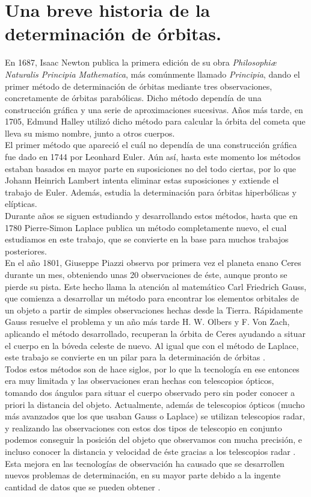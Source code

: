 \section{Una breve historia de la determinación de órbitas.}
\label{sec:history}
En 1687, Isaac Newton publica la primera edición de su obra \textit{Philosophiæ Naturalis Principia Mathematica}, más comúnmente llamado \textit{Principia}, dando el primer método de determinación de órbitas mediante tres observaciones, concretamente de órbitas parabólicas. Dicho método dependía de una construcción gráfica y una serie de aproximaciones sucesivas. Años más tarde, en 1705, Edmund Halley utilizó dicho método para calcular la órbita del cometa que lleva su mismo nombre, junto a otros cuerpos.\\

El primer método que apareció el cuál no dependía de una construcción gráfica fue dado en 1744 por Leonhard Euler. Aún así, hasta este momento los métodos estaban basados en mayor parte en suposiciones no del todo ciertas, por lo que Johann Heinrich Lambert intenta eliminar estas suposiciones y extiende el trabajo de Euler. Además, estudia la determinación para órbitas hiperbólicas y elípticas.\\

Durante años se siguen estudiando y desarrollando estos métodos, hasta que en 1780 Pierre-Simon Laplace publica un método completamente nuevo, el cual estudiamos en este trabajo, que se convierte en la base para muchos trabajos posteriores.\\

En el año 1801, Giuseppe Piazzi observa por primera vez el planeta enano Ceres durante un mes, obteniendo unas 20 observaciones de éste, aunque pronto se pierde su pista. Este hecho llama la atención al matemático Carl Friedrich Gauss, que comienza a desarrollar un método para encontrar los elementos orbitales de un objeto a partir de simples observaciones hechas desde la Tierra. Rápidamente Gauss resuelve el problema y un año más tarde H. W. Olbers y F. Von Zach, aplicando el método desarrollado, recuperan la órbita de Ceres ayudando a situar el cuerpo en la bóveda celeste de nuevo. Al igual que con el método de Laplace, este trabajo se convierte en un pilar para la determinación de órbitas \cite{moulton}.\\


Todos estos métodos son de hace siglos, por lo que la tecnología en ese entonces era muy limitada y las observaciones eran hechas con telescopios ópticos, tomando dos ángulos para situar el cuerpo observado pero sin poder conocer a priori la distancia del objeto. Actualmente, además de telescopios ópticos (mucho más avanzados que los que usaban Gauss o Laplace) se utilizan telescopios radar, y realizando las observaciones con estos dos tipos de telescopio en conjunto podemos conseguir la posición del objeto que observamos con mucha precisión, e incluso conocer la distancia y velocidad de éste gracias a los telescopios radar \cite{brett_r_wilson}. Esta mejora en las tecnologías de observación ha causado que se desarrollen nuevos problemas de determinación, en su mayor parte debido a la ingente cantidad de datos que se pueden obtener \cite{gronchi}.\\

